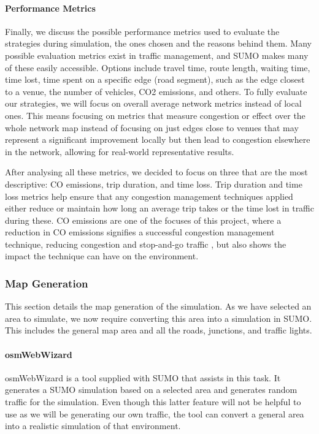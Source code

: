 \paragraph{Performance Metrics}
Finally, we discuss the possible performance metrics used to evaluate the strategies during simulation, the ones chosen and the reasons behind them. Many possible evaluation metrics exist in traffic management, and SUMO makes many of these easily accessible. Options include travel time, route length, waiting time, time lost, time spent on a specific edge (road segment), such as the edge closest to a venue, the number of vehicles, CO2 emissions, and others. To fully evaluate our strategies, we will focus on overall average network metrics instead of local ones. This means focusing on metrics that measure congestion or effect over the whole network map instead of focusing on just edges close to venues that may represent a significant improvement locally but then lead to congestion elsewhere in the network, allowing for real-world representative results.

After analysing all these metrics, we decided to focus on three that are the most descriptive: CO emissions, trip duration, and time loss. Trip duration and time loss metrics help ensure that any congestion management techniques applied either reduce or maintain how long an average trip takes or the time lost in traffic during these. CO emissions are one of the focuses of this project, where a reduction in CO emissions signifies a successful congestion management technique, reducing congestion and stop-and-go traffic \cite{hofer_large_2018}, but also shows the impact the technique can have on the environment.

\subsubsection{Map Generation}
This section details the map generation of the simulation. As we have selected an area to simulate, we now require converting this area into a simulation in SUMO. This includes the general map area and all the roads, junctions, and traffic lights.

\paragraph{osmWebWizard} osmWebWizard is a tool supplied with SUMO that assists in this task. It generates a SUMO simulation based on a selected area and generates random traffic for the simulation. Even though this latter feature will not be helpful to use as we will be generating our own traffic, the tool can convert a general area into a realistic simulation of that environment.

